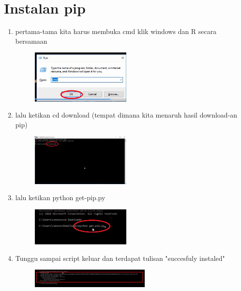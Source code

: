 \chapter*{Instalan pip}

\begin{enumerate}
	\item pertama-tama kita harus membuka cmd klik windows dan R secara bersamaan
	\begin{figure} [h]
	\includegraphics[width=5cm]{pip/0pip.png}
	\centering
	\end{figure}
	
	\item lalu ketikan cd download (tempat dimana kita menaruh hasil download-an pip)
	\begin{figure} [h]
	\includegraphics[width=5cm]{pip/1pip.png}
	\centering
	\end{figure}

	\item lalu ketikan python get-pip.py 
	\begin{figure} [h]
	\includegraphics[width=5cm]{pip/2pip.png}
	\centering
	\end{figure}
	
	\item Tunggu sampai script keluar dan terdapat tulisan "succesfuly instaled"
	\begin{figure} [h]
	\includegraphics[width=6cm]{pip/3pip.png}
	\centering
	\end{figure}
	
	

\end{enumerate}
